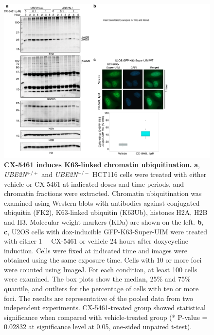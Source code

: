 \begin{figure}
    \centering
    \includegraphics[width=1\textwidth]{../figures/Figure4_chromatin_ubiquitination}
    \caption[Chromatin ubiquitination]
            {\small{\textbf{CX-5461 induces K63-linked chromatin ubiquitination.}}
            \newline
        \textbf{a}, \textit{UBE2N$^{+/+}$} and \textit{UBE2N$^{-/-}$} HCT116 cells were treated with either vehicle or CX-5461 at indicated doses and time periods, and chromatin fractions were extracted. Chromatin ubiquitination was examined using Western blots with antibodies against conjugated ubiquitin (FK2), K63-linked ubiquitin (K63Ub), histones H2A, H2B and H3. Molecular weight markers (KDa) are shown on the left. 
        \newline
        \textbf{b}, 
        \textbf{c}, U2OS cells with dox-inducible GFP-K63-Super-UIM were treated with either \SI{1}{\micro\Molar} CX-5461 or vehicle 24 hours after doxycycline induction. Cells were fixed at indicated time and images were obtained using the same exposure time. Cells with 10 or more foci were counted using ImageJ. For each condition, at least 100 cells were examined.  The box  plots show the median, 25\% and 75\% quantile, and outliers for the percentage of cells with ten or more foci. The results are representative of the pooled data from two independent experiments. CX-5461-treated group showed statistical significance when compared with vehicle-treated group (* P-value = 0.02832 at significance level at 0.05, one-sided unpaired t-test). 
            }
        \label{fig:chromatin-ubiquitination}
\end{figure}


